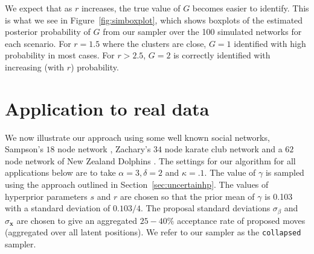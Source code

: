 \documentclass[12pt]{article}
\newcommand{\x}{{\mathbf{x}}}
\begin{document}
We expect that as $r$ increases, the true value of $G$ becomes easier to identify. This is what we see in Figure~\ref{fig:simboxplot}, which shows boxplots of the estimated posterior probability of $G$ from our sampler over the 100 simulated networks for each scenario. For $r=1.5$ where the clusters are close, $G=1$ identified with high probability in most cases. For $r>2.5$, $G=2$ is correctly identified with increasing (with $r$) probability.



\section{Application to real data} \label{sec:examples}

We now illustrate our approach using some well known social networks, Sampson's $18$ node network \cite{sampson68},  Zachary's $34$ node karate club network \cite{zachary77} and a $62$ node network of New Zealand Dolphins \cite{lusseauetal03}. The settings for our algorithm for all applications below are to take $\alpha = 3, \delta = 2$ and $\kappa = .1$. The value of $\gamma$ is sampled using the approach outlined in Section~\ref{sec:uncertainhp}. The values of hyperprior parameters $s$ and $r$ are chosen so that the prior mean of $\gamma$ is 0.103 with a standard deviation of $0.103/4$. The proposal standard deviations $\sigma_{\beta}$ and  $\sigma_{\x}$ are chosen to give an aggregated $25-40\%$ acceptance rate of proposed moves (aggregated over all latent positions). We refer to our sampler as the \texttt{collapsed} sampler.
\end{document}

